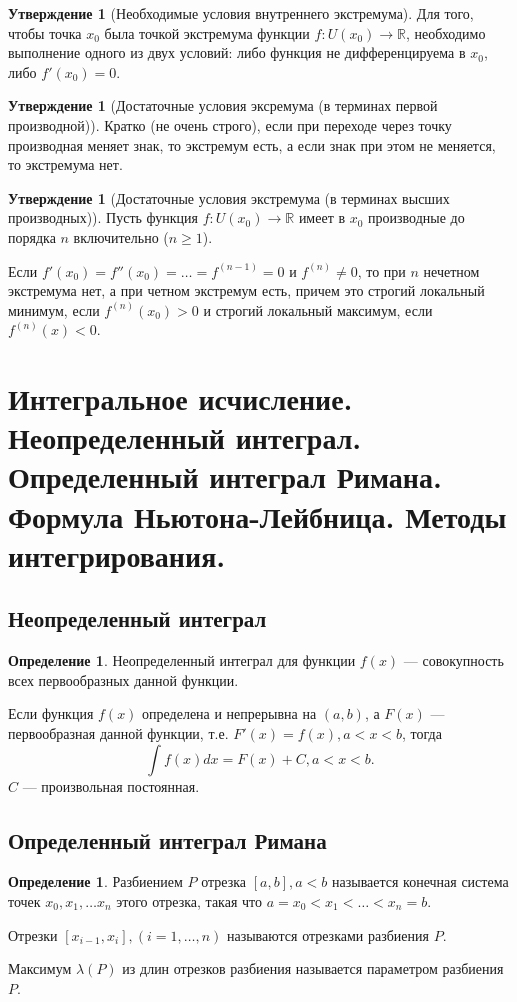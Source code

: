 \documentclass[12pt]{report}
\theoremstyle{definition}
\newtheorem{definition}[theorem]{Определение}
\newtheorem{statement}[theorem]{Утверждение}
\newcommand{\R}{\mathbb R}
\begin{document}
\begin{statement}[Необходимые условия внутреннего экстремума]
Для того, чтобы точка $x_0$ была точкой экстремума функции
$f: U(x_0) \rightarrow \R$, необходимо выполнение одного из двух условий:
либо функция не дифференцируема в $x_0$, либо $f'(x_0) = 0$.
\end{statement}

\begin{statement}[Достаточные условия эксремума (в терминах первой производной)]
Кратко (не очень строго), если при переходе через точку производная меняет знак,
то экстремум есть, а если знак при этом не меняется, то экстремума нет.
\end{statement}

\begin{statement}[Достаточные условия экстремума (в терминах высших производных)]
Пусть функция $f: U(x_0) \rightarrow \R$ имеет в $x_0$ производные до порядка $n$
включительно ($n \ge 1$).

Если $f'(x_0) = f''(x_0) = \dots = f^{(n-1)} = 0$ и $f^{(n)} \ne 0$, то при
$n$ нечетном экстремума нет, а при четном экстремум есть, причем это строгий
локальный минимум, если $f^{(n)}(x_0) > 0$ и строгий локальный максимум,
если $f^{(n)}(x) < 0$.
\end{statement}


\section
{
  Интегральное исчисление. Неопределенный интеграл. Определенный интеграл Римана.
  Формула Ньютона-Лейбница. Методы интегрирования.
}

\subsection{Неопределенный интеграл}
\begin{definition}
Неопределенный интеграл для функции $f(x)$ --- совокупность всех первообразных
данной функции.

Если функция $f(x)$ определена и непрерывна на $(a, b)$, а $F(x)$ --- первообразная
данной функции, т.е. $F'(x) = f(x), a < x < b$, тогда
$$
\int f(x) dx = F(x) + C, a < x < b.
$$
$C$ --- произвольная постоянная.
\end{definition}

\subsection{Определенный интеграл Римана}
\begin{definition}
Разбиением $P$ отрезка $[a, b], a < b$ называется конечная система точек
$x_0, x_1, \dots x_n$ этого отрезка, такая что $a = x_0 < x_1 < \dots < x_n = b$.

Отрезки $[x_{i-1}, x_i], (i=1, \dots, n)$ называются отрезками разбиения $P$.

Максимум $\lambda(P)$ из длин отрезков разбиения называется параметром разбиения $P$.
\end{definition}
\end{document}
